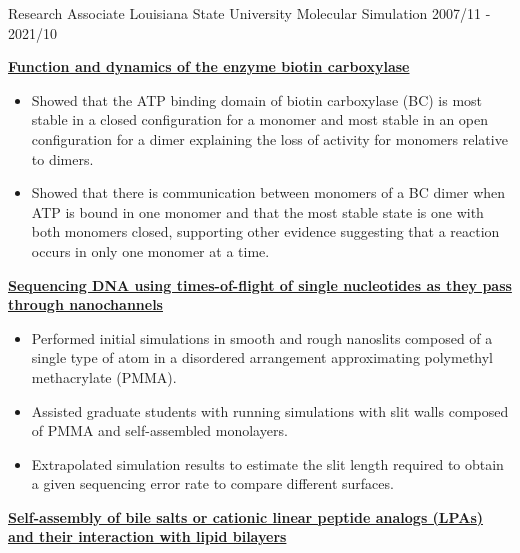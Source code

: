 \pagebreak


\begin{cventries}
  \cventry
    {Research Associate} %
    {Louisiana State University} %
    {Molecular Simulation} %
    {2007/11 - 2021/10} %
    {
        \begin{cvitems} %
            \item {\textbf{\underline{Function and dynamics of the enzyme biotin carboxylase}}}
                \vspace{2pt}
                \begin{itemize}
                \item {Showed that the ATP binding domain of biotin carboxylase (BC) is most stable in a closed configuration for a monomer and most stable in an open configuration for a dimer explaining the loss of activity for monomers relative to dimers.}
                \item {Showed that there is communication between monomers of a BC dimer when ATP is bound in one monomer and that the most stable state is one with both monomers closed, supporting other evidence suggesting that a reaction occurs in only one monomer at a time.}
                \end{itemize}
            \item {\textbf{\underline{Sequencing DNA using times-of-flight of single nucleotides as they pass through nanochannels}}}
                \vspace{2pt}
                \begin{itemize}
                    \item {Performed initial simulations in smooth and rough nanoslits composed of a single type of atom in a disordered arrangement approximating polymethyl methacrylate (PMMA).}
                    \item {Assisted graduate students with running simulations with slit walls composed of PMMA and self-assembled monolayers.}
                    \item {Extrapolated simulation results to estimate the slit length required to obtain a given sequencing error rate to compare different surfaces.}
                \end{itemize}        
            \item {\textbf{\underline{Self-assembly of bile salts or cationic linear peptide analogs (LPAs) and their interaction with lipid bilayers}}}

\end{cvitems}}
\end{cventries}
